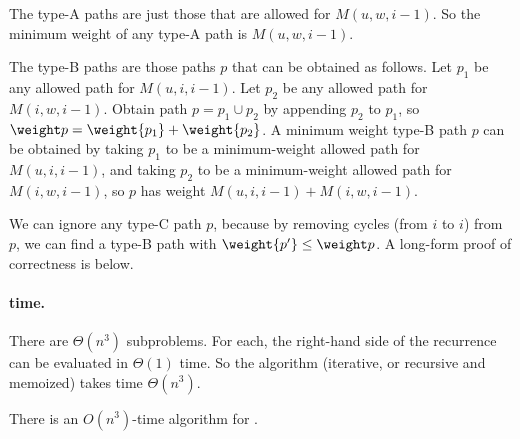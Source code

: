 The type-A paths are just those that are allowed for $M(u, w, i-1)$.
So the minimum weight of any type-A path is $M(u, w, i-1)$.

The type-B paths are those paths $p$ that can be obtained as follows.
Let $p_1$ be any allowed path for $M(u, i, i-1)$.
Let $p_2$ be any allowed path for $M(i, w, i-1)$. 
Obtain path $p = p_1 \cup p_2$ by appending $p_2$ to $p_1$,
so $\weight p = \weight {p_1} + \weight{p_2}$.
A minimum weight type-B path $p$ can be
obtained by taking $p_1$ to be a minimum-weight allowed path for $M(u, i, i-1)$,
and taking $p_2$ to be a minimum-weight allowed path for $M(i, w, i-1)$,
so $p$ has weight $M(u, i, i-1) + M(i, w, i-1)$.

We can ignore any type-C path $p$,
because by removing cycles (from $i$ to $i$) from $p$,
we can find a type-B path with $\weight {p'} \le \weight p$.
A long-form proof of correctness is below.

\paragraph{time.}
There are $\Theta(n^3)$ subproblems.
For each, the right-hand side of the recurrence can be evaluated in $\Theta(1)$ time.
So the algorithm (iterative, or recursive and memoized)
takes time $\Theta(n^3)$.

\begin{theorem}
  There is an $O(n^3)$-time algorithm for .
\end{theorem}






  

